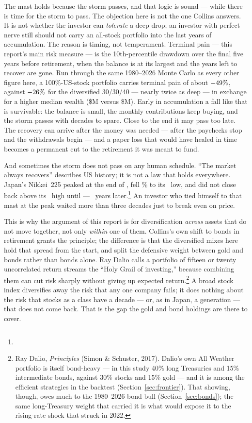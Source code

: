 \documentclass[11pt]{article}
\begin{document}
The mast holds because the storm passes, and that logic is sound --- while there is time for the storm
to pass. The objection here is not the one Collins answers. It is not whether the investor can
\emph{tolerate} a deep drop; an investor with perfect nerve still should not carry an all-stock portfolio
into the last years of accumulation. The reason is timing, not temperament. Terminal pain --- this
report's main risk measure --- is the 10th-percentile drawdown over the final five years before
retirement, when the balance is at its largest and the years left to recover are gone. Run through the
same 1980--2026 Monte Carlo as every other figure here, a 100\%-US-stock portfolio carries terminal pain of
about $-49\%$, against $-26\%$ for the diversified 30/30/40 --- nearly twice as deep
--- in exchange for a higher median wealth
(\$\StockOnlyWealth M versus \$\DivWealth M). Early in accumulation a fall like that is survivable: the
balance is small, the monthly contributions keep buying, and the storm passes with decades to spare.
Close to the end it may pass too late. The recovery can arrive after the money was needed --- after the
paychecks stop and the withdrawals begin --- and a paper loss that would have healed in time becomes a
permanent cut to the retirement it was meant to fund.

And sometimes the storm does not pass on any human schedule. ``The market always recovers'' describes US
history; it is not a law that holds everywhere. Japan's Nikkei~225 peaked at the end of \JapanPeakYear,
fell \JapanDecline\% to its \JapanTroughYear\ low, and did not close back above its \JapanPeakYear\ high
until \JapanRecoverYear{} --- \JapanRecoverYears\ years later.\footnote{\JapanSource} An investor who
tied himself to that mast at the peak waited more than three decades just to break even on price.

This is why the argument of this report is for diversification \emph{across} assets that do not move
together, not only \emph{within} one of them. Collins's own shift to bonds in retirement grants the
principle; the difference is that the diversified mixes here hold that spread from the start, and split
the defensive weight between gold and bonds rather than bonds alone. Ray Dalio calls a portfolio of fifteen or twenty uncorrelated return streams
the ``Holy Grail of investing,'' because combining them can cut risk sharply without giving up expected
return.\footnote{Ray Dalio, \emph{Principles} (Simon \& Schuster, 2017). Dalio's own All Weather
portfolio is itself bond-heavy --- in this study 40\% long Treasuries and 15\% intermediate bonds,
against 30\% stocks and 15\% gold --- and it is among the efficient strategies in the backtest
(Section~\ref{sec:frontier}). That showing, though, owes much to the 1980--2026 bond bull
(Section~\ref{sec:bonds}); the same long-Treasury weight that carried it is what would expose it to the
rising-rate shock that struck in 2022.} A broad stock index
diversifies away the risk that any one company fails; it does nothing about the risk that stocks as a
class have a decade --- or, as in Japan, a generation --- that does not come back. That is the gap the
gold and bond holdings are there to cover.
\end{document}
